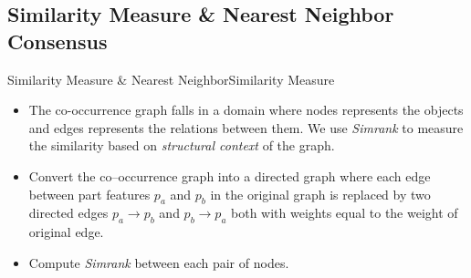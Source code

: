 \documentclass[10pt]{beamer}
\begin{document}
\subsection{Similarity Measure \& Nearest Neighbor Consensus}
\begin{frame}{Similarity Measure \& Nearest Neighbor}{Similarity Measure}
\begin{itemize}
\item The co-occurrence graph falls in a domain where nodes represents the objects and edges represents the relations between them. We use \textit{Simrank} to measure the similarity based on \textit{structural context} of the graph.
\pause
\item Convert the co--occurrence graph into a directed graph where each edge between part features $p_a$ and $p_b$ in the original graph is replaced by two directed edges $p_a \rightarrow p_b$ and $p_b \rightarrow p_a$ both with weights equal to the weight of original edge.
\pause
\item Compute \textit{Simrank} between each pair of nodes.
\end{itemize}

\end{frame}
\end{document}
